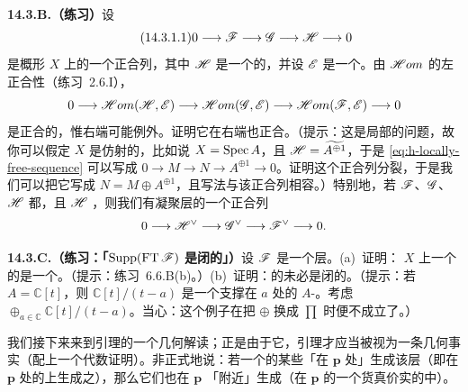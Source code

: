 \textbf{14.3.B.（练习）}\quad 设
\begin{equation*}\tag{14.3.1.1}\label{eq:h-locally-free-sequence}
0\longrightarrow\mathscr{F}\longrightarrow\mathscr{G}\longrightarrow\mathscr{H}\longrightarrow 0
\end{equation*}
是概形 $X$ 上\trQCSheaf{}的一个正合列，其中 $\mathscr{H}$ 是一个\trLocallyFree{}的\trQCSheaf，并设 $\mathscr{E}$ 是一个\trQCSheaf。由 $\mathscr{H}om$ 的左正合性（\mbox{练习~2.6.I}），
\[
0\longrightarrow\mathscr{H}om(\mathscr{H},\mathscr{E})\longrightarrow\mathscr{H}om(\mathscr{G},\mathscr{E})\longrightarrow\mathscr{H}om(\mathscr{F},\mathscr{E})\longrightarrow 0
\]
是正合的，惟右端可能例外。证明它在右端也正合。（提示：这是局部的问题，故你可以假定 $X$ 是仿射的，比如说 $X=\operatorname{Spec} A$，且 $\mathscr{H}=\widetilde{A^{\oplus 1}}$，于是 \eqref{eq:h-locally-free-sequence} 可以写成 $0\to M\to N\to A^{\oplus 1}\to 0$。证明这个正合列分裂，于是我们可以把它写成 $N=M\oplus A^{\oplus 1}$，且写法与该正合列相容。）特别地，若 $\mathscr{F}$、$\mathscr{G}$、$\mathscr{H}$ 都\trCoh，且 $\mathscr{H}$ \trLocallyFree，则我们有凝聚层的一个正合列
\[
0\longrightarrow\mathscr{H}^{\vee}\longrightarrow\mathscr{G}^{\vee}\longrightarrow\mathscr{F}^{\vee}\longrightarrow 0.
\]

\textbf{14.3.C.（练习：「$\operatorname{Supp}(\operatorname{FT}\mathscr{F})$ 是闭的」）}\quad 设 $\mathscr{F}$ 是一个\trAbelianGroups{}层。(a)~证明：\trScheme{} $X$ 上一个\trFiniteType{}\trQCSheaf{}的\trSupport{}是一个\trClosedSubset。（提示：\mbox{练习~6.6.B(b)}。）(b)~证明：\trQCSheaf{}的\trSupport{}未必是闭的。（提示：若 $A=\mathbb{C}[t]$，则 $\mathbb{C}[t]/(t-a)$ 是一个支撑在 $a$ 处的 $A$-\trModule。考虑 $\oplus_{a\in\mathbb{C}}\mathbb{C}[t]/(t-a)$。当心：这个例子在把 $\oplus$ 换成 $\prod$ 时便不成立了。）

我们接下来来到\trNakayama{}引理的一个几何解读；正是由于它，\trNakayama{}引理才应当被视为一条几何事实（配上一个代数证明）。非正式地说：若一个\trFiniteType{}\trQCSheaf{}的某些\trSection{}「在 $\mathbf{p}$ 处」生成该层（即在 $\mathbf{p}$ 处的\trFiber{}上生成之），那么它们也在 $\mathbf{p}$ 「附近」生成（在 $\mathbf{p}$ 的一个货真价实的\trOpen\trNeighborhood{}中）。

